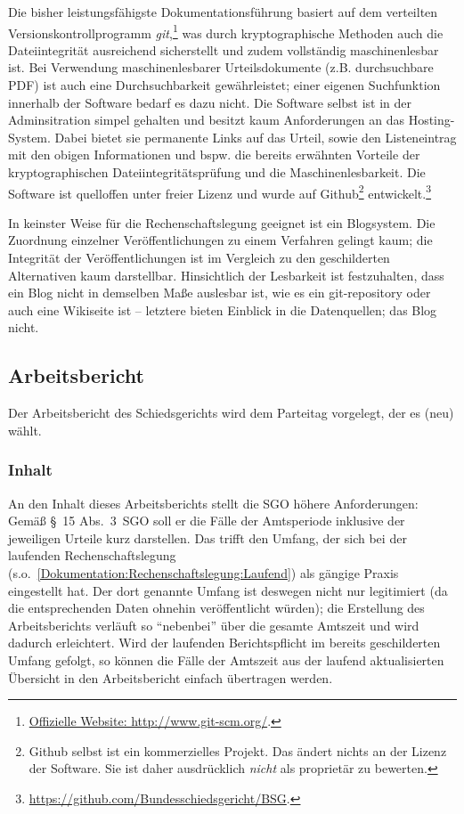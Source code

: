 Die bisher leistungsfähigste Dokumentationsführung basiert auf dem verteilten Versionskontrollprogramm \emph{git},\footnote{\href{http://www.git-scm.org/}{Offizielle Website: http://www.git-scm.org/}.} was durch kryptographische Methoden auch die Dateiintegrität ausreichend sicherstellt und zudem vollständig maschinenlesbar ist.
Bei Verwendung maschinenlesbarer Urteilsdokumente (z.B. durchsuchbare PDF) ist auch eine Durchsuchbarkeit gewährleistet; einer eigenen Suchfunktion innerhalb der Software bedarf es dazu nicht.
Die Software selbst ist in der Adminsitration simpel gehalten und besitzt kaum Anforderungen an das Hosting-System.
Dabei bietet sie permanente Links auf das Urteil, sowie den Listeneintrag mit den obigen Informationen und bspw. die bereits erwähnten Vorteile der kryptographischen Dateiintegritätsprüfung und die Maschinenlesbarkeit.
Die Software ist quelloffen unter freier Lizenz und wurde auf Github\footnote{Github selbst ist ein kommerzielles Projekt. Das ändert nichts an der Lizenz der Software. Sie ist daher ausdrücklich \emph{nicht} als proprietär zu bewerten.} entwickelt.\footnote{\href{https://github.com/Bundesschiedsgericht/BSG}{https://github.com/Bundesschiedsgericht/BSG}.}

In keinster Weise für die Rechenschaftslegung geeignet ist ein Blogsystem.
Die Zuordnung einzelner Veröffentlichungen zu einem Verfahren gelingt kaum; die Integrität der Veröffentlichungen ist im Vergleich zu den geschilderten Alternativen kaum darstellbar.
Hinsichtlich der Lesbarkeit ist festzuhalten, dass ein Blog nicht in demselben Maße auslesbar ist, wie es ein git-repository oder auch eine Wikiseite ist -- letztere bieten Einblick in die Datenquellen; das Blog nicht.

\subsection{Arbeitsbericht}
\label{Dokumentation:Rechenschaftslegung:Arbeitsbericht}
Der Arbeitsbericht des Schiedsgerichts wird dem Parteitag vorgelegt, der es (neu) wählt.

\subsubsection{Inhalt}
\label{Dokumentation:Rechenschaftslegung:Arbeitsbericht:Inhalt}
An den Inhalt dieses Arbeitsberichts stellt die SGO höhere Anforderungen:
Gemäß \S~15 Abs.~3~SGO soll er die Fälle der Amtsperiode inklusive der jeweiligen Urteile kurz darstellen.
Das trifft den Umfang, der sich bei der laufenden Rechenschaftslegung (s.o.~\ref{Dokumentation:Rechenschaftslegung:Laufend}) als gängige Praxis eingestellt hat.
Der dort genannte Umfang ist deswegen nicht nur legitimiert (da die entsprechenden Daten ohnehin veröffentlicht würden); die Erstellung des Arbeitsberichts verläuft so \enquote{nebenbei} über die gesamte Amtszeit und wird dadurch erleichtert.
Wird der laufenden Berichtspflicht im bereits geschilderten Umfang gefolgt, so können die Fälle der Amtszeit aus der laufend aktualisierten Übersicht in den Arbeitsbericht einfach übertragen werden.

